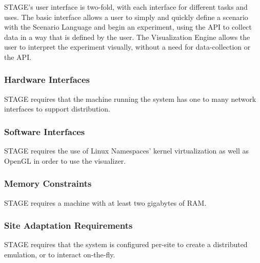 \documentclass[titlepage]{article}
\begin{document}
STAGE's user interface is two-fold, with each interface for different tasks and uses. The basic interface allows a user to simply and quickly define a scenario with the Scenario Language and begin an experiment, using the API to collect data in a way that is defined by the user. The Visualization Engine allows the user to interpret the experiment visually, without a need for data-collection or the API.


\subsubsection{Hardware Interfaces%
  \label{hardware-interfaces}%
}

STAGE requires that the machine running the system has one to many network interfaces to support distribution.


\subsubsection{Software Interfaces%
  \label{software-interfaces}%
}

STAGE requires the use of Linux Namespaces' kernel virtualization as well as OpenGL in order to use the visualizer.


\subsubsection{Memory Constraints%
  \label{memory-constraints}%
}

STAGE requires a machine with at least two gigabytes of RAM.


\subsubsection{Site Adaptation Requirements%
  \label{site-adaptation-requirements}%
}

STAGE requires that the system is configured per-site to create a distributed emulation, or to interact on-the-fly.

\end{document}
